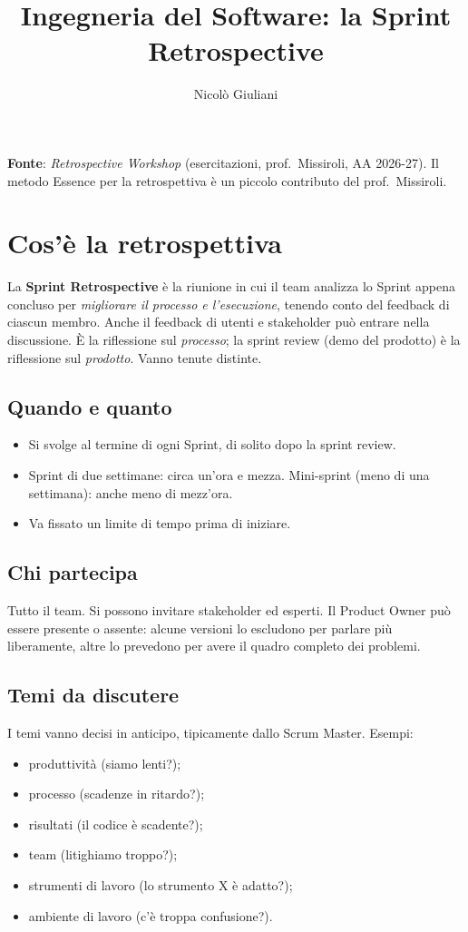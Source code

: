 \documentclass[a4paper,11pt]{article}
\title{Ingegneria del Software: la Sprint Retrospective}
\author{Nicolò Giuliani}
\date{}
\begin{document}
\maketitle

\textbf{Fonte}: \emph{Retrospective Workshop} (esercitazioni, prof.\ Missiroli, AA 2026-27).
Il metodo Essence per la retrospettiva è un piccolo contributo del prof.\ Missiroli.

\section{Cos'è la retrospettiva}
La \textbf{Sprint Retrospective} è la riunione in cui il team analizza lo Sprint appena
concluso per \emph{migliorare il processo e l'esecuzione}, tenendo conto del feedback di
ciascun membro. Anche il feedback di utenti e stakeholder può entrare nella discussione.
È la riflessione sul \emph{processo}; la sprint review (demo del prodotto) è la riflessione
sul \emph{prodotto}. Vanno tenute distinte.

\subsection*{Quando e quanto}
\begin{itemize}[nosep]
  \item Si svolge al termine di ogni Sprint, di solito dopo la sprint review.
  \item Sprint di due settimane: circa un'ora e mezza. Mini-sprint (meno di una settimana):
        anche meno di mezz'ora.
  \item Va fissato un limite di tempo prima di iniziare.
\end{itemize}

\subsection*{Chi partecipa}
Tutto il team. Si possono invitare stakeholder ed esperti. Il Product Owner può essere
presente o assente: alcune versioni lo escludono per parlare più liberamente, altre lo
prevedono per avere il quadro completo dei problemi.

\subsection*{Temi da discutere}
I temi vanno decisi in anticipo, tipicamente dallo Scrum Master. Esempi:
\begin{itemize}[nosep]
  \item produttività (siamo lenti?);
  \item processo (scadenze in ritardo?);
  \item risultati (il codice è scadente?);
  \item team (litighiamo troppo?);
  \item strumenti di lavoro (lo strumento X è adatto?);
  \item ambiente di lavoro (c'è troppa confusione?).
\end{itemize}
\end{document}
